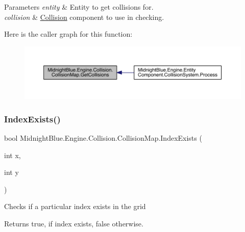 \begin{DoxyParams}{Parameters}
{\em entity} & Entity to get collisions for.\\
\hline
{\em collision} & \hyperlink{namespace_midnight_blue_1_1_engine_1_1_collision}{Collision} component to use in checking.\\
\hline
\end{DoxyParams}
Here is the caller graph for this function\+:
\nopagebreak
\begin{figure}[H]
\begin{center}
\leavevmode
\includegraphics[width=350pt]{class_midnight_blue_1_1_engine_1_1_collision_1_1_collision_map_ac6cb425b42914d6035b917d056ad8773_icgraph}
\end{center}
\end{figure}
\hypertarget{class_midnight_blue_1_1_engine_1_1_collision_1_1_collision_map_af68316c70c60b8b8bfa5cb47f824a5da}{}\label{class_midnight_blue_1_1_engine_1_1_collision_1_1_collision_map_af68316c70c60b8b8bfa5cb47f824a5da} 
\subsubsection{\texorpdfstring{Index\+Exists()}{IndexExists()}\hspace{0.1cm}{\footnotesize\ttfamily [1/2]}}
{\footnotesize\ttfamily bool Midnight\+Blue.\+Engine.\+Collision.\+Collision\+Map.\+Index\+Exists (\begin{DoxyParamCaption}\item[{int}]{x,  }\item[{int}]{y }\end{DoxyParamCaption})\hspace{0.3cm}{\ttfamily [inline]}}



Checks if a particular index exists in the grid 

\begin{DoxyReturn}{Returns}
{\ttfamily true}, if index exists, {\ttfamily false} otherwise.
\end{DoxyReturn}


